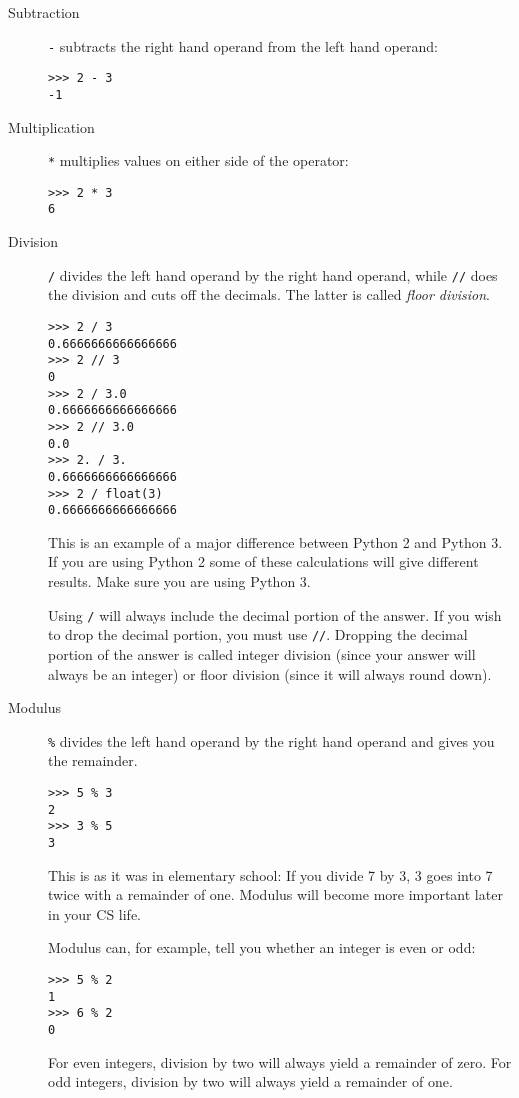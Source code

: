 \documentclass[12pt,hidelinks]{article}
\begin{document}
\begin{description}
  \item[Subtraction] \texttt{-} subtracts the right hand operand from the left
    hand operand:
    \begin{lstlisting}[style=bash]
>>> 2 - 3
-1
    \end{lstlisting}

  \item[Multiplication] \texttt{*} multiplies values on either side of the
    operator:

    \begin{lstlisting}[style=bash]
>>> 2 * 3
6
    \end{lstlisting}

  \item[Division] \texttt{/} divides the left hand operand by the right hand
    operand, while \texttt{//} does the division and cuts off the decimals. The
    latter is called \emph{floor division}.

  \begin{lstlisting}[style=bash]
>>> 2 / 3
0.6666666666666666
>>> 2 // 3
0
>>> 2 / 3.0
0.6666666666666666
>>> 2 // 3.0
0.0
>>> 2. / 3.
0.6666666666666666
>>> 2 / float(3)
0.6666666666666666
  \end{lstlisting}

    This is an example of a major difference between Python 2 and Python 3. If
    you are using Python 2 some of these calculations will give different
    results. Make sure you are using Python 3.

    Using \texttt{/} will always include the decimal portion of the answer. If
    you wish to drop the decimal portion, you must use \texttt{//}. Dropping the
    decimal portion of the answer is called integer division (since your answer
    will always be an integer) or floor division (since it will always round
    down).

  \item[Modulus] \texttt{\%} divides the left hand operand by the right hand
    operand and gives you the remainder.

    \begin{lstlisting}[style=bash]
>>> 5 % 3
2
>>> 3 % 5
3
    \end{lstlisting}

    This is as it was in elementary school: If you divide 7 by 3, 3 goes into 7
    twice with a remainder of one. Modulus will become more important later in
    your CS life.

    Modulus can, for example, tell you whether an integer is even or odd:
    \begin{lstlisting}[style=bash]
>>> 5 % 2
1
>>> 6 % 2
0
    \end{lstlisting}
    For even integers, division by two will always yield a remainder of zero.
    For odd integers, division by two will always yield a remainder of one.


\end{description}
\end{document}
